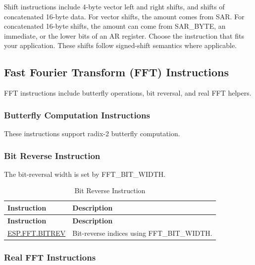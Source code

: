 \documentclass[main\_\_EN.tex]{subfiles}
\begin{document}
Shift instructions include 4-byte vector left and right shifts, and shifts of concatenated 16-byte data. For vector shifts, the amount comes from SAR. For concatenated 16-byte shifts, the amount can come from SAR\_BYTE, an immediate, or the lower bits of an AR register. Choose the instruction that fits your application. These shifts follow signed-shift semantics where applicable.



\subsection{Fast Fourier Transform (FFT) Instructions}
\label{sec:pie-fft-instructions}

FFT instructions include butterfly operations, bit reversal, and real FFT helpers.

\subsubsection{Butterfly Computation Instructions}

These instructions support radix-2 butterfly computation.



\subsubsection{Bit Reverse Instruction}

The bit-reversal width is set by FFT\_BIT\_WIDTH.

\begin{longtable}[c]{|l|m{10cm}|}
    \caption{Bit Reverse Instruction}
    \label{tab:pie-bitrev-instructions}\\
    \hline
    \rowcolor{lightgray}
    \textbf{Instruction} & \textbf{Description} \\\hline
    \endfirsthead
    \rowcolor{lightgray}
    \textbf{Instruction} & \textbf{Description} \\\hline
    \endhead
    \endfoot

    \hyperref[instruction:ESPFFTBITREV]{ESP.FFT.BITREV} & Bit-reverse indices using FFT\_BIT\_WIDTH.
    \\\hline
\end{longtable}

\subsubsection{Real FFT Instructions}
\end{document}
